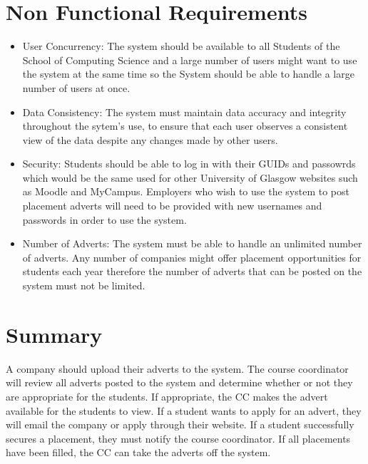 \documentclass{l3deliverable}
\begin{document}
\section{Non Functional Requirements}

\begin{itemize}
\item User Concurrency: The system should be available to all Students of the School of Computing Science and a large number of users might want to use the system at the same time so the System should be able to handle a large number of users at once.
\item Data Consistency: The system must maintain data accuracy and integrity throughout the sytem's use, to ensure that each user observes a consistent view of the data despite any changes made by other users.
\item Security: Students should be able to log in with their GUIDs and passowrds which would be the same used for other University of Glasgow websites such as Moodle and MyCampus. Employers who wish to use the system to post placement adverts will need to be provided with new usernames and passwords in order to use the system.
\item Number of Adverts: The system must be able to handle an unlimited number of adverts. Any number of companies might offer placement opportunities for students each year therefore the number of adverts that can be posted on the system must not be limited.
\end{itemize}

\section{Summary}

A company should upload their adverts to the system. The course coordinator will review
all adverts posted to the system and determine whether or not they are appropriate for the
students. If appropriate, the CC makes the advert available for the students to view. If a student
wants to apply for an advert, they will email the company or apply through their website. If
a student successfully secures a placement, they must notify the course coordinator. If all
placements have been filled, the CC can take the adverts off the system.

\appendix
\end{document}
